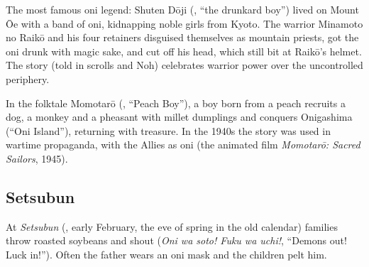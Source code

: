 \begin{example}
The most famous oni legend: Shuten Dōji (, ``the drunkard boy'') lived on
Mount Ōe with a band of oni, kidnapping noble girls from Kyoto. The warrior Minamoto no
Raikō and his four retainers disguised themselves as mountain priests, got the oni drunk
with magic sake, and cut off his head, which still bit at Raikō's helmet. The story (told
in scrolls and Noh) celebrates warrior power over the uncontrolled periphery.
\end{example}

\begin{example}[Momotarō]
In the folktale Momotarō (, ``Peach Boy''), a boy born from a peach recruits a
dog, a monkey and a pheasant with millet dumplings and conquers Onigashima (``Oni
Island''), returning with treasure. In the 1940s the story was used in wartime propaganda,
with the Allies as oni (the animated film \emph{Momotarō: Sacred Sailors}, 1945).
\end{example}

\subsection{Setsubun}

At \emph{Setsubun} (, early February, the eve of spring in the old calendar)
families throw roasted soybeans and shout  (\emph{Oni wa soto! Fuku wa
uchi!}, ``Demons out! Luck in!''). Often the father wears an oni mask and the children
pelt him.

\begin{center}
\end{center}

